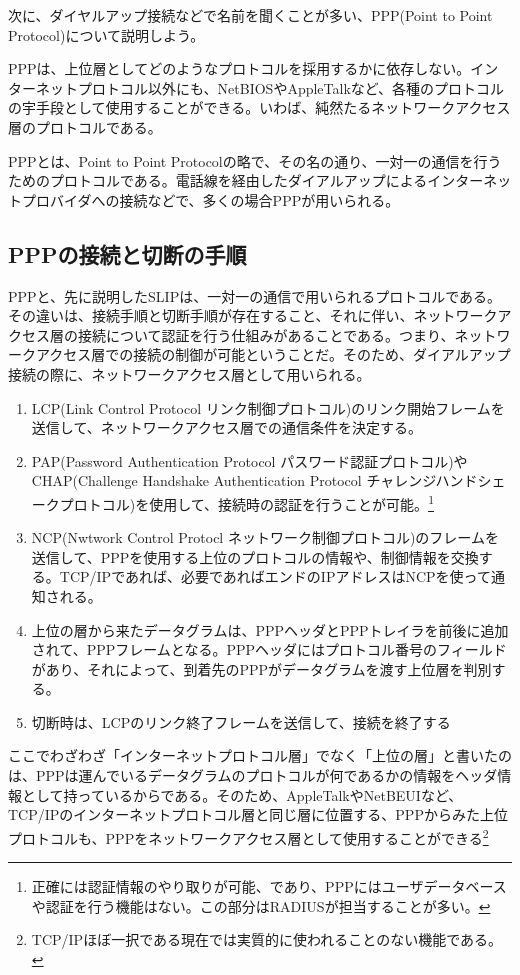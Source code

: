 次に、ダイヤルアップ接続などで名前を聞くことが多い、PPP(Point to Point Protocol)について説明しよう。

PPPは、上位層としてどのようなプロトコルを採用するかに依存しない。インターネットプロトコル以外にも、NetBIOSやAppleTalkなど、各種のプロトコルの宇手段として使用することができる。いわば、純然たるネットワークアクセス層のプロトコルである。

PPPとは、Point to Point Protocolの略で、その名の通り、一対一の通信を行うためのプロトコルである。電話線を経由したダイアルアップによるインターネットプロバイダへの接続などで、多くの場合PPPが用いられる。

\subsection{PPPの接続と切断の手順}
PPPと、先に説明したSLIPは、一対一の通信で用いられるプロトコルである。その違いは、接続手順と切断手順が存在すること、それに伴い、ネットワークアクセス層の接続について認証を行う仕組みがあることである。つまり、ネットワークアクセス層での接続の制御が可能ということだ。そのため、ダイアルアップ接続の際に、ネットワークアクセス層として用いられる。

\begin{enumerate}
\item LCP(Link Control Protocol リンク制御プロトコル)のリンク開始フレームを送信して、ネットワークアクセス層での通信条件を決定する。
\item PAP(Password Authentication Protocol パスワード認証プロトコル)やCHAP(Challenge Handshake Authentication Protocol チャレンジハンドシェークプロトコル)を使用して、接続時の認証を行うことが可能。\footnote{正確には認証情報のやり取りが可能、であり、PPPにはユーザデータベースや認証を行う機能はない。この部分はRADIUSが担当することが多い。}
\item NCP(Nwtwork Control Protocl ネットワーク制御プロトコル)のフレームを送信して、PPPを使用する上位のプロトコルの情報や、制御情報を交換する。TCP/IPであれば、必要であればエンドのIPアドレスはNCPを使って通知される。
\item 上位の層から来たデータグラムは、PPPヘッダとPPPトレイラを前後に追加されて、PPPフレームとなる。PPPヘッダにはプロトコル番号のフィールドがあり、それによって、到着先のPPPがデータグラムを渡す上位層を判別する。
\item 切断時は、LCPのリンク終了フレームを送信して、接続を終了する
\end{enumerate}

ここでわざわざ「インターネットプロトコル層」でなく「上位の層」と書いたのは、PPPは運んでいるデータグラムのプロトコルが何であるかの情報をヘッダ情報として持っているからである。そのため、AppleTalkやNetBEUIなど、TCP/IPのインターネットプロトコル層と同じ層に位置する、PPPからみた上位プロトコルも、PPPをネットワークアクセス層として使用することができる\footnote{TCP/IPほぼ一択である現在では実質的に使われることのない機能である。}

